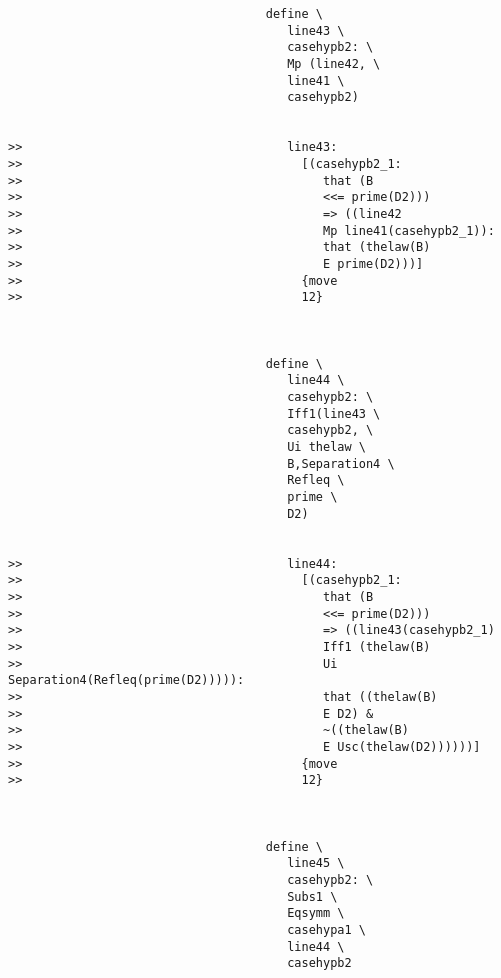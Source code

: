 \documentclass[12pt]{article}
\begin{document}
\begin{verbatim}
                                    define \
                                       line43 \
                                       casehypb2: \
                                       Mp (line42, \
                                       line41 \
                                       casehypb2)


>>                                     line43:
>>                                       [(casehypb2_1:
>>                                          that (B
>>                                          <<= prime(D2)))
>>                                          => ((line42
>>                                          Mp line41(casehypb2_1)):
>>                                          that (thelaw(B)
>>                                          E prime(D2)))]
>>                                       {move
>>                                       12}



                                    define \
                                       line44 \
                                       casehypb2: \
                                       Iff1(line43 \
                                       casehypb2, \
                                       Ui thelaw \
                                       B,Separation4 \
                                       Refleq \
                                       prime \
                                       D2)


>>                                     line44:
>>                                       [(casehypb2_1:
>>                                          that (B
>>                                          <<= prime(D2)))
>>                                          => ((line43(casehypb2_1)
>>                                          Iff1 (thelaw(B)
>>                                          Ui Separation4(Refleq(prime(D2))))):
>>                                          that ((thelaw(B)
>>                                          E D2) &
>>                                          ~((thelaw(B)
>>                                          E Usc(thelaw(D2))))))]
>>                                       {move
>>                                       12}



                                    define \
                                       line45 \
                                       casehypb2: \
                                       Subs1 \
                                       Eqsymm \
                                       casehypa1 \
                                       line44 \
                                       casehypb2



\end{verbatim}
\end{document}
